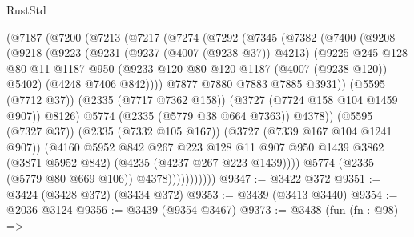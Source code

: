 \begin{lexlean}{RustStd}
\begin{coremodule}
                (@7187
                  (@7200
                    (@7213
                      (@7217
                        (@7274
                          (@7292
                            (@7345
                              (@7382
                                (@7400
                                  (@9208
                                    (@9218
                                      (@9223
                                        (@9231
                                          (@9237 (@4007 (@9238 @37)) @4213)
                                          (@9225
                                            @245
                                            @128
                                            @80
                                            @11
                                            @1187
                                            @950
                                            (@9233 @120 @80 @120 @1187 (@4007 (@9238 @120)) @5402)
                                            (@4248 @7406 @842))))
                                      @7877
                                      @7880
                                      @7883
                                      @7885
                                      @3931))
                                  (@5595 (@7712 @37))
                                  (@2335 (@7717 @7362 @158))
                                  (@3727 (@7724 @158 @104 @1459 @907))
                                  @8126)
                                @5774
                                (@2335 (@5779 @38 @664 @7363))
                                @4378))
                            (@5595 (@7327 @37))
                            (@2335 (@7332 @105 @167))
                            (@3727 (@7339 @167 @104 @1241 @907))
                            (@4160
                              @5952
                              @842
                              @267
                              @223
                              @128
                              @11
                              @907
                              @950
                              @1439
                              @3862
                              (@3871 @5952 @842)
                              (@4235 (@4237 @267 @223 @1439))))
                          @5774
                          (@2335 (@5779 @80 @669 @106))
                          @4378)))))))))))
@9347 := @3422 @372
@9351 := @3424 (@3428 @372) (@3434 @372)
@9353 := @3439 (@3413 @3440)
@9354 := @2036 @3124
@9356 := @3439 (@9354 @3467)
@9373 := @3438
    (fun (fn : @98) =>

\end{coremodule}
\end{lexlean}
